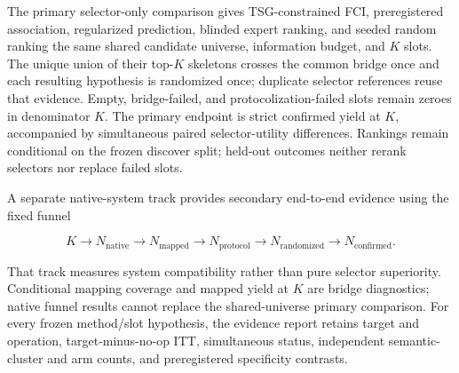 The primary selector-only comparison gives TSG-constrained FCI,
preregistered association, regularized prediction, blinded expert ranking, and
seeded random ranking the same shared candidate universe, information budget,
and $K$ slots. The unique union of their top-$K$ skeletons crosses the common
bridge once and each resulting hypothesis is randomized once; duplicate
selector references reuse that evidence. Empty, bridge-failed, and
protocolization-failed slots remain zeroes in denominator $K$. The primary
endpoint is strict confirmed yield at $K$, accompanied by simultaneous paired
selector-utility differences. Rankings remain conditional on the frozen
discover split; held-out outcomes neither rerank selectors nor replace failed
slots.

A separate native-system track provides secondary end-to-end evidence using
the fixed funnel

\[
K \rightarrow N_{\mathrm{native}} \rightarrow N_{\mathrm{mapped}}
\rightarrow N_{\mathrm{protocol}} \rightarrow N_{\mathrm{randomized}}
\rightarrow N_{\mathrm{confirmed}}.
\]

That track measures system compatibility rather than pure selector
superiority. Conditional mapping coverage and mapped yield at $K$ are bridge
diagnostics; native funnel results cannot replace the shared-universe primary
comparison. For every frozen method/slot hypothesis, the evidence report
retains target and operation, target-minus-no-op ITT, simultaneous status,
independent semantic-cluster and arm counts, and preregistered specificity
contrasts.

